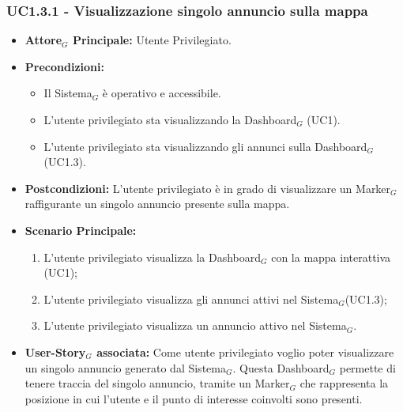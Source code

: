 \documentclass[10pt]{article}
\begin{document}
\begin{justify}
\subsubsection{\textbf{UC1.3.1 - Visualizzazione singolo annuncio sulla mappa}}
\label{UC1.3.1}
\begin{itemize}
     \item \textbf{Attore$_G$ Principale:} Utente Privilegiato.
     \item \textbf{Precondizioni:}
        \begin{itemize}
        \item Il Sistema$_G$ è operativo e accessibile.
    	\item L'utente privilegiato sta visualizzando la Dashboard$_G$ (UC1).
    	\item L'utente privilegiato sta visualizzando gli annunci sulla Dashboard$_G$ (UC1.3).
        \end{itemize}
     \item \textbf{Postcondizioni:} L'utente privilegiato è in grado di visualizzare un Marker$_G$ raffigurante un singolo annuncio presente sulla mappa.
     \item \textbf{Scenario Principale:}
        \begin{enumerate}
            \item L'utente privilegiato visualizza la Dashboard$_G$ con la mappa interattiva (UC1);
            \item L'utente privilegiato visualizza gli annunci attivi nel Sistema$_G$(UC1.3);
            \item L'utente privilegiato visualizza un annuncio attivo nel Sistema$_G$.
        \end{enumerate}
     \item \textbf{User-Story$_G$ associata:}
     Come utente privilegiato voglio poter visualizzare un singolo annuncio generato dal Sistema$_G$. Questa Dashboard$_G$ permette di tenere traccia del singolo annuncio, tramite un Marker$_G$ che rappresenta la posizione in cui l'utente e il punto di interesse coinvolti sono presenti.
\end{itemize}

\end{justify}
\end{document}

